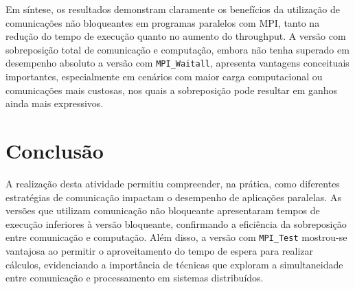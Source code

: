 \documentclass[a4paper, 12pt]{article}
\begin{document}
	Em síntese, os resultados demonstram claramente os benefícios da utilização de comunicações não bloqueantes em programas paralelos com MPI, tanto na redução do tempo de execução quanto no aumento do throughput. A versão com sobreposição total de comunicação e computação, embora não tenha superado em desempenho absoluto a versão com \texttt{MPI\_Waitall}, apresenta vantagens conceituais importantes, especialmente em cenários com maior carga computacional ou comunicações mais custosas, nos quais a sobreposição pode resultar em ganhos ainda mais expressivos.
	
	\section{Conclusão}
	
	\hspace{0.62cm}A realização desta atividade permitiu compreender, na prática, como diferentes estratégias de comunicação impactam o desempenho de aplicações paralelas. As versões que utilizam comunicação não bloqueante apresentaram tempos de execução inferiores à versão bloqueante, confirmando a eficiência da sobreposição entre comunicação e computação. Além disso, a versão com \texttt{MPI\_Test} mostrou-se vantajosa ao permitir o aproveitamento do tempo de espera para realizar cálculos, evidenciando a importância de técnicas que exploram a simultaneidade entre comunicação e processamento em sistemas distribuídos.	
	
	
\end{document}
